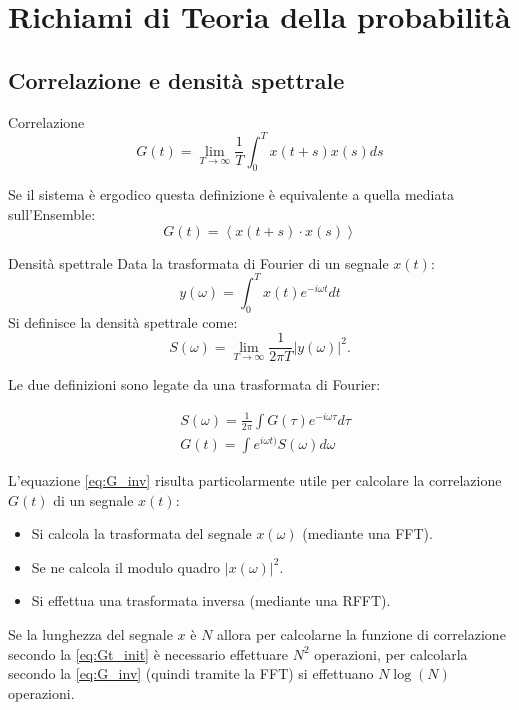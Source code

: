 \section{Richiami di Teoria della probabilità}%
\label{sub:Lezione 2}
\mylocaltoc

\subsection{Correlazione e densità spettrale}%
\label{sub:Correlazione e densità spettrale}
\begin{bluebox}{Correlazione}
    \begin{equation}
        G\left(t\right)=\lim_{T \to \infty} \frac{1}{T}\int_{0}^{T} x\left(t+s\right) x\left(s\right)ds
	\label{eq:Gt_init}
    \end{equation}
\end{bluebox}
\noindent
Se il sistema è ergodico questa definizione è equivalente a quella mediata sull'Ensemble:
\begin{equation}
    G( t) = \left<x(t+s) \cdot  x(s)\right>\label{eq:Gt}
\end{equation}
\begin{bluebox}{Densità spettrale}
    Data la trasformata di Fourier di un segnale $x(t)$:
    \[
	y(\omega) = \int_{0}^{T} x\left(t\right)e^{-i\omega t}dt
    \]
    Si definisce la densità spettrale come:
    \[
        S\left(\omega\right) = \lim_{T \to \infty} \frac{1}{2\pi T}\left|y(\omega) \right|^2
    .\] 
\end{bluebox}
\noindent
Le due definizioni sono legate da una trasformata di Fourier: 
\begin{bluebox}{}
    \begin{align}
	&S\left(\omega\right) = \frac{1}{2\pi}\int G\left(\tau\right)e^{-i\omega \tau}d\tau\\
	&G(t) = \int e^{i\omega t)} S(\omega) d\omega \label{eq:G_inv}
    \end{align}
\end{bluebox}
\noindent
L'equazione \ref{eq:G_inv} risulta particolarmente utile per calcolare la correlazione $G(t)$ di un segnale $x(t)$:
\begin{itemize}
    \item Si calcola la trasformata del segnale $x(\omega)$ (mediante una FFT).
    \item Se ne calcola il modulo quadro $\left| x(\omega) \right|^2$.
    \item Si effettua una trasformata inversa (mediante una RFFT).
\end{itemize}
Se la lunghezza del segnale $x$ è $N$ allora per calcolarne la funzione di correlazione secondo la \ref{eq:Gt_init} è necessario effettuare $N^2$ operazioni, per calcolarla secondo la \ref{eq:G_inv} (quindi tramite la FFT) si effettuano $N\log(N)$ operazioni.
